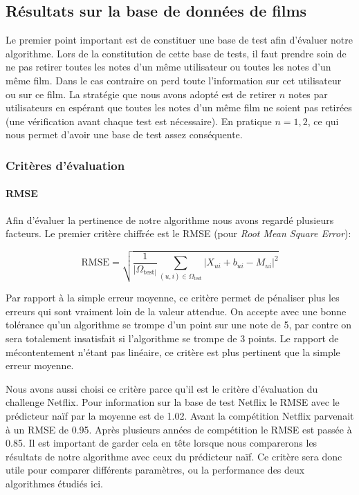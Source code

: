 \documentclass[10pt,a4paper]{article}
\begin{document}
\subsection{Résultats sur la base de données de films}

Le premier point important est de constituer une base de test afin d'évaluer notre algorithme. Lors de la constitution de cette base de tests, il faut prendre soin de ne pas retirer toutes les notes d'un même utilisateur ou toutes les notes d'un même film. Dans le cas contraire on perd toute l'information sur cet utilisateur ou sur ce film. La stratégie que nous avons adopté est de retirer $n$ notes par utilisateurs en espérant que toutes les notes d'un même film ne soient pas retirées (une vérification avant chaque test est nécessaire). En pratique $n=1,2$, ce qui nous permet d'avoir une base de test assez conséquente.

\subsubsection*{Critères d'évaluation}

\paragraph{RMSE}

Afin d'évaluer la pertinence de notre algorithme nous avons regardé plusieurs facteurs. Le premier critère chiffrée est le RMSE (pour \textit{Root Mean Square Error}):

$$ \text{RMSE} = \sqrt{\frac{1}{|\Omega_{\text{test}|}}\sum_{(u,i)\in \Omega_{\text{test}}} |X_{ui}+b_{ui}-M_{ui}|^2} $$

Par rapport à la simple erreur moyenne, ce critère permet de pénaliser plus les erreurs qui sont vraiment loin de la  valeur attendue. On accepte avec une bonne tolérance qu'un algorithme se trompe d'un point sur une note de 5, par contre on sera totalement insatisfait si l'algorithme se trompe de 3 points. Le rapport de mécontentement n'étant pas linéaire, ce critère est plus pertinent que la simple erreur moyenne.


Nous avons aussi choisi ce critère parce qu'il est le critère d'évaluation du challenge Netflix. Pour information sur la base de test Netflix le RMSE avec le prédicteur naïf par la moyenne est de 1.02. Avant la compétition Netflix parvenait à un RMSE de 0.95. Après plusieurs années de compétition le RMSE est passée à 0.85. Il est important de garder cela en tête lorsque nous comparerons les résultats de notre algorithme avec ceux du prédicteur naïf. Ce critère sera donc utile pour comparer différents paramètres, ou la performance des deux algorithmes étudiés ici. 
\end{document}
